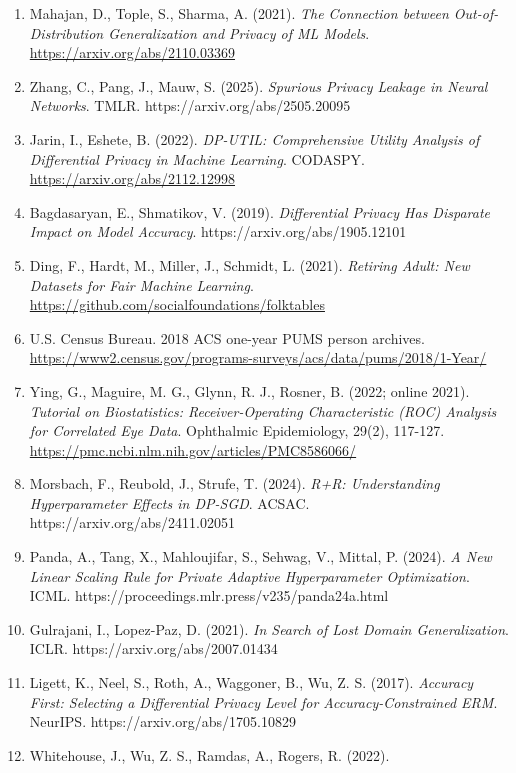 \documentclass[
  10pt,
]{article}
\providecommand{\tightlist}{%
  \setlength{\itemsep}{0pt}\setlength{\parskip}{0pt}}
\begin{document}
\begin{enumerate}
\def\labelenumi{\arabic{enumi}.}
\tightlist
\item
  Mahajan, D., Tople, S., Sharma, A. (2021). \emph{The Connection
  between Out-of-Distribution Generalization and Privacy of ML Models}.
  \url{https://arxiv.org/abs/2110.03369}
\item
  Zhang, C., Pang, J., Mauw, S. (2025). \emph{Spurious Privacy Leakage
  in Neural Networks}. TMLR. https://arxiv.org/abs/2505.20095
\item
  Jarin, I., Eshete, B. (2022). \emph{DP-UTIL: Comprehensive Utility
  Analysis of Differential Privacy in Machine Learning}. CODASPY.
  \url{https://arxiv.org/abs/2112.12998}
\item
  Bagdasaryan, E., Shmatikov, V. (2019). \emph{Differential Privacy Has
  Disparate Impact on Model Accuracy}. https://arxiv.org/abs/1905.12101
\item
  Ding, F., Hardt, M., Miller, J., Schmidt, L. (2021). \emph{Retiring
  Adult: New Datasets for Fair Machine Learning}.
  \url{https://github.com/socialfoundations/folktables}
\item
  U.S. Census Bureau. 2018 ACS one-year PUMS person archives.
  \url{https://www2.census.gov/programs-surveys/acs/data/pums/2018/1-Year/}
\item
  Ying, G., Maguire, M. G., Glynn, R. J., Rosner, B. (2022; online
  2021). \emph{Tutorial on Biostatistics: Receiver-Operating
  Characteristic (ROC) Analysis for Correlated Eye Data}. Ophthalmic
  Epidemiology, 29(2), 117-127.
  \url{https://pmc.ncbi.nlm.nih.gov/articles/PMC8586066/}
\item
  Morsbach, F., Reubold, J., Strufe, T. (2024). \emph{R+R: Understanding
  Hyperparameter Effects in DP-SGD}. ACSAC.
  https://arxiv.org/abs/2411.02051
\item
  Panda, A., Tang, X., Mahloujifar, S., Sehwag, V., Mittal, P. (2024).
  \emph{A New Linear Scaling Rule for Private Adaptive Hyperparameter
  Optimization}. ICML. https://proceedings.mlr.press/v235/panda24a.html
\item
  Gulrajani, I., Lopez-Paz, D. (2021). \emph{In Search of Lost Domain
  Generalization}. ICLR. https://arxiv.org/abs/2007.01434
\item
  Ligett, K., Neel, S., Roth, A., Waggoner, B., Wu, Z. S. (2017).
  \emph{Accuracy First: Selecting a Differential Privacy Level for
  Accuracy-Constrained ERM}. NeurIPS. https://arxiv.org/abs/1705.10829
\item
  Whitehouse, J., Wu, Z. S., Ramdas, A., Rogers, R. (2022).

\end{enumerate}
\end{document}

